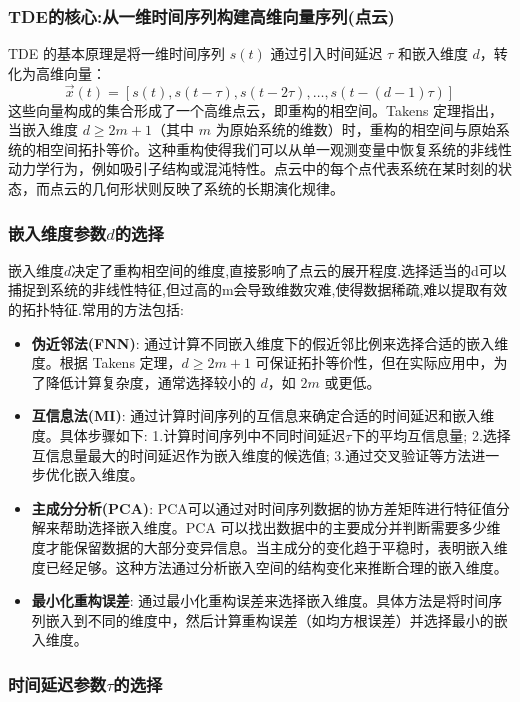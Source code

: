 \subsubsection{TDE的核心:从一维时间序列构建高维向量序列(点云)}
TDE 的基本原理是将一维时间序列 \( s(t) \) 通过引入时间延迟 \( \tau \) 和嵌入维度 \( d \)，转化为高维向量：
\begin{equation}
\vec{x}(t) = \left[ s(t), s(t - \tau), s(t - 2\tau), \dots, s(t - (d - 1)\tau) \right]
\end{equation}
这些向量构成的集合形成了一个高维点云，即重构的相空间。Takens 定理指出，当嵌入维度 \( d \geq 2m + 1 \)（其中 \( m \) 为原始系统的维数）时，重构的相空间与原始系统的相空间拓扑等价。这种重构使得我们可以从单一观测变量中恢复系统的非线性动力学行为，例如吸引子结构或混沌特性。点云中的每个点代表系统在某时刻的状态，而点云的几何形状则反映了系统的长期演化规律。


\subsubsection{嵌入维度参数\(d\)的选择}
嵌入维度\(d\)决定了重构相空间的维度,直接影响了点云的展开程度.选择适当的d可以捕捉到系统的非线性特征,但过高的m会导致维数灾难,使得数据稀疏,难以提取有效的拓扑特征.常用的方法包括:
\begin{itemize}
    \item \textbf{伪近邻法(FNN)}: 通过计算不同嵌入维度下的假近邻比例来选择合适的嵌入维度。根据 Takens 定理，\( d \geq 2m + 1 \) 可保证拓扑等价性，但在实际应用中，为了降低计算复杂度，通常选择较小的 \( d \)，如 \( 2m \) 或更低。
    \item \textbf{互信息法(MI)}: 通过计算时间序列的互信息来确定合适的时间延迟和嵌入维度。具体步骤如下: 1.计算时间序列中不同时间延迟$\tau$下的平均互信息量; 2.选择互信息量最大的时间延迟作为嵌入维度的候选值; 3.通过交叉验证等方法进一步优化嵌入维度。
    \item \textbf{主成分分析(PCA)}: PCA可以通过对时间序列数据的协方差矩阵进行特征值分解来帮助选择嵌入维度。PCA 可以找出数据中的主要成分并判断需要多少维度才能保留数据的大部分变异信息。当主成分的变化趋于平稳时，表明嵌入维度已经足够。这种方法通过分析嵌入空间的结构变化来推断合理的嵌入维度。
    \item \textbf{最小化重构误差}: 通过最小化重构误差来选择嵌入维度。具体方法是将时间序列嵌入到不同的维度中，然后计算重构误差（如均方根误差）并选择最小的嵌入维度。
\end{itemize}

\subsubsection{时间延迟参数$\tau$的选择}


